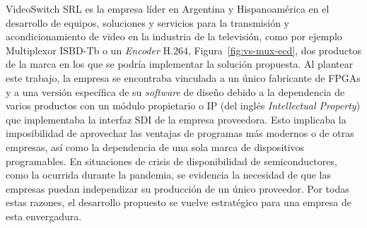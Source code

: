 VideoSwitch SRL \citep{vs-srl} es la empresa líder en Argentina y Hispanoamérica
en el desarrollo de equipos, soluciones y servicios para la transmisión y
acondicionamiento de video en la industria de la televisión, como por ejemplo
Multiplexor ISBD-Tb o un \textit{Encoder} H.264, Figura~\ref{fig:vs-mux-ecd},
dos productos de la marca en los que se podría implementar la solución propuesta.
Al plantear este trabajo, la empresa se encontraba vinculada a un único
fabricante de FPGAs y a una versión específica de su \textit{software} de
diseño debido a la dependencia de varios productos con un módulo propietario o
IP (del inglés \textit{Intellectual Property}) que implementaba la interfaz SDI
de la empresa proveedora. Esto implicaba la imposibilidad de aprovechar las
ventajas de programas más modernos o de otras empresas, así como la dependencia
de una sola marca de dispositivos programables. En situaciones de crisis de
disponibilidad de semiconductores, como la ocurrida durante la pandemia, se
evidencia la necesidad de que las empresas puedan independizar su producción de
un único proveedor. Por todas estas razones, el desarrollo propuesto se vuelve
estratégico para una empresa de esta envergadura.
